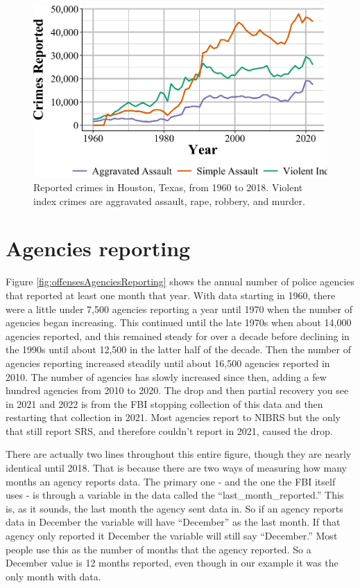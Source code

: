 \documentclass[
  12pt,
  openany]{book}
\begin{document}
\begin{figure}

{\centering \includegraphics[width=0.9\linewidth]{03_offenses_known_files/figure-latex/simpleIndex-1} 

}

\caption{Reported crimes in Houston, Texas, from 1960 to 2018. Violent index crimes are aggravated assault, rape, robbery, and murder.}\label{fig:simpleIndex}
\end{figure}

\section{Agencies reporting}\label{offensesKnownReporting}

Figure \ref{fig:offensesAgenciesReporting} shows the annual number of police agencies that reported at least one month that year. With data starting in 1960, there were a little under 7,500 agencies reporting a year until 1970 when the number of agencies began increasing. This continued until the late 1970s when about 14,000 agencies reported, and this remained steady for over a decade before declining in the 1990s until about 12,500 in the latter half of the decade. Then the number of agencies reporting increased steadily until about 16,500 agencies reported in 2010. The number of agencies has slowly increased since then, adding a few hundred agencies from 2010 to 2020. The drop and then partial recovery you see in 2021 and 2022 is from the FBI stopping collection of this data and then restarting that collection in 2021. Most agencies report to NIBRS but the only that still report SRS, and therefore couldn't report in 2021, caused the drop.

There are actually two lines throughout this entire figure, though they are nearly identical until 2018. That is because there are two ways of measuring how many months an agency reports data. The primary one - and the one the FBI itself uses - is through a variable in the data called the ``last\_month\_reported.'' This is, as it sounds, the last month the agency sent data in. So if an agency reports data in December the variable will have ``December'' as the last month. If that agency only reported it December the variable will still say ``December.'' Most people use this as the number of months that the agency reported. So a December value is 12 months reported, even though in our example it was the only month with data.
\end{document}
